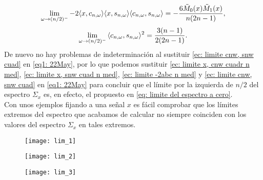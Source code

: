 \begin{equation}
\label{ec: limite -2abc n med}
\lim\limits_{\omega \rightarrow (n/2)^{-}}{
-2 \langle x, c_{n, \omega} \rangle
\langle x, s_{n, \omega} \rangle
\langle c_{n, \omega}, s_{n, \omega} \rangle
= 
- \frac{6\tilde{M}_{0}(x)\tilde{M}_{1}(x)}{n(2n-1)},
}
\end{equation}
\begin{equation}
\label{ec: limite cnw, snw cuad}
\lim\limits_{\omega \rightarrow (n/2)^{-}}{\langle
c_{n, \omega}, s_{n, \omega}
\rangle^{2} }
= \frac{3(n-1)}{2(2n-1)}.
\end{equation}
De nuevo no hay problemas de indeterminación al 
sustituir \eqref{ec: limite cnw, snw cuad} en 
\eqref{eq1: 22May}, por lo que podemos 
sustituir 
\eqref{ec: limite x, cnw cuadr n med}, 
\eqref{ec: limite x, snw cuad n med}, 
\eqref{ec: limite -2abc n med} y 
\eqref{ec: limite cnw, snw cuad} en 
\eqref{eq1: 22May} para concluir que el límite por la izquierda
de $n/2$ del espectro $\Sigma_{x}$ es, en efecto,
el propuesto
en 
\eqref{eq: limite del espectro a cero}. \\


Con unos ejemplos 
fijando a una señal $x$
es fácil comprobar que los límites extremos del espectro
que acabamos de calcular no siempre coinciden con los valores
del espectro $\Sigma_{x}$ en tales extremos.
\QEDB
\vspace{0.2cm}


\begin{figure}[H]
	\centering
	\texttt{[image: lim\_1]} 
\end{figure}	

\begin{figure}[H]
	\centering
	\texttt{[image: lim\_2]} 
\end{figure}

\begin{figure}[H]
	\centering
	\texttt{[image: lim\_3]} 
\end{figure}

